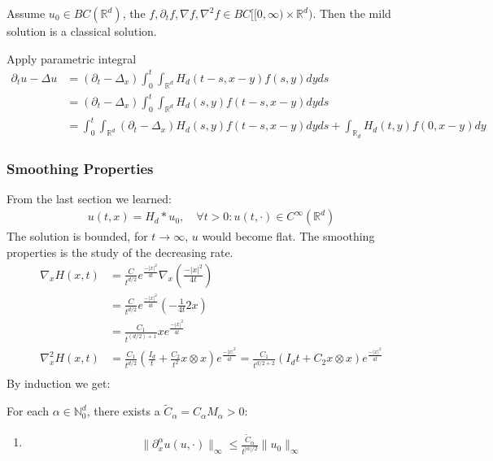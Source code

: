 \begin{theorem}
	Assume $u_0 \in BC(\mathbb{R}^d)$, the $f, \partial_t f, \nabla f, \nabla^2 f \in BC[[0, \infty) \times \mathbb{R}^d)$. Then the mild solution is a classical solution.
\end{theorem}
Apply parametric integral
\begin{align*}
	\partial_t u - \Delta u &= (\partial_t - \Delta_x) \int_0^t \int_{\mathbb{R}^d} H_d(t - s, x - y) f(s, y) dy ds\\
	&= (\partial_t - \Delta_x) \int_0^t \int_{\mathbb{R}^d}
	   H_d(s, y) f(t - s, x -y)dy ds\\
	&= \int_0^t \int_{\mathbb{R}^d} (\partial_t - \Delta_x)H_d(s, y)f(t-s, x-y)dyds + \int_{\mathbb{R}_d}H_d(t, y)f(0, x-y)dy 
\end{align*}
\begin{remark}
\end{remark}


\subsubsection{Smoothing Properties}
From the last section we learned:
\begin{align*}
	u(t, x) = H_d * u_0,\quad \forall t >0: u(t, \cdot) \in C^\infty(\mathbb{R}^d)
\end{align*}
The solution is bounded, for $t \rightarrow \infty$, $u$ would become flat. The smoothing properties is the study of the decreasing rate.
\begin{align*}
	\nabla_x H(x, t) &= \frac{C}{t^{d/2}} e^{\frac{-|x|^2}{4t}} \nabla_x (\frac{-|x|^2}{4t})\\
	&= \frac{C}{t^{d/2}} e^{\frac{-|x|^2}{4t}}(-\frac{1}{4t}2x)\\
	&= \frac{C_1}{t^{(d/2)+ 1}} x e^{\frac{-|x|^2}{4t}}\\
	\nabla^2_x H(x, t)
	&= \frac{C_1}{t^{d/2}}(\frac{I_d}{t} + \frac{C_2}{t^2} x \otimes x) e^{\frac{-|x|^2}{4t}} = \frac{C_1}{t^{d/2 + 2}}(I_d t + C_2 x \otimes x) e^{\frac{-|x|^2}{4t}} \\
\end{align*}
By induction we get:


\begin{theorem}
	For each $\alpha \in \mathbb{N}_0^d$, there exists a $\tilde{C}_\alpha = C_\alpha M_\alpha > 0:$
	\begin{enumerate}
		\item
		\begin{align*}
			\|\partial_x^\alpha u(u, \cdot)\|_\infty \leq
			\frac{\tilde{C}_\alpha}{t^{|\alpha|/2}} \|u_0\|_\infty
		\end{align*}
	\end{enumerate}
\end{theorem}


